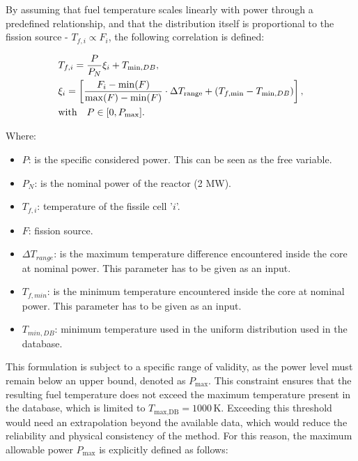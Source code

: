 \documentclass[preprint,review,12pt]{elsarticle}
\begin{document}
By assuming that fuel temperature scales linearly with power through a predefined relationship, and that the distribution itself is proportional to the fission source - $T_{f,i} \propto F_{i} $, the following correlation is defined:


\begin{align}
 &T_{f,i} =  \frac{P}{P_N} \xi_i  + T_{\min,DB}, 
 \\ &
\xi_i= \left[ \frac{F_i - \min(F)}{\max(F) - \min(F)} \cdot \Delta T_{\text{range}} + (T_{f,\min} - T_{\min,DB}) \right], 
\notag \\ &
 \text{with} \quad P \in [0,P_{\text{max}}].
\label{eq:correction_power_temperature}
\end{align}



Where: 

\begin{itemize}
    \item $P$: is the specific considered power. This can be seen as the free variable.
    \item $P_N$: is the nominal power of the reactor (2 MW). 
    \item $T_{f,i}$: temperature of the fissile cell '$i$'.
    \item $F$: fission source. 
    \item $\Delta T_{range} $: is the maximum temperature difference encountered inside the core at nominal power. This parameter has to be given as an input.     
    \item $T_{f,min}$: is the minimum temperature encountered inside the core at nominal power. This parameter has to be given as an input.  
    \item $T_{min,DB}$: minimum temperature used in the uniform distribution used in the database.   
\end{itemize}

This formulation is subject to a specific range of validity, as the power level must remain below an upper bound, denoted as \( P_{\text{max}} \). This constraint ensures that the resulting fuel temperature does not exceed the maximum temperature present in the database, which is limited to \( T_{\text{max,DB}} = 1000\,\text{K} \). Exceeding this threshold would need an extrapolation beyond the available data, which would reduce the reliability and physical consistency of the method. For this reason, the maximum allowable power \( P_{\text{max}} \) is explicitly defined as follows:
\end{document}
